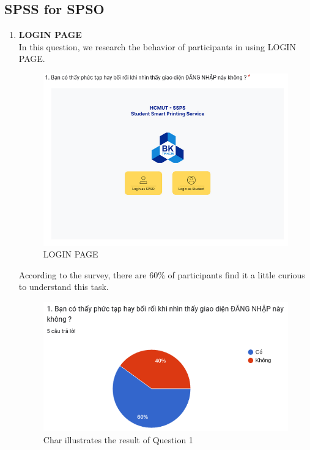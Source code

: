 \documentclass[a4paper]{report}
\begin{document}
\subsection{SPSS for SPSO}
\begin{enumerate}
    \item \textbf{LOGIN PAGE} \\
    In this question, we research the behavior of participants in using LOGIN PAGE.
\begin{figure}[!h]
    \centering
    \includegraphics[width=0.8\linewidth]{images/image_uasbility/Q1_SPSO.png}
    \caption{LOGIN PAGE}
    \label{fig:LOGIN PAGE}
\end{figure}
\newpage
According to the survey, there are 60\% of participants find it a little curious to understand this task.
\begin{figure}[!h]
    \centering
    \includegraphics[width=0.8\linewidth]{images/image_uasbility/A1_SPSO.png}
    \caption{Char illustrates the result of Question 1}
    \label{fig:Chat illustrates the results of Question 1}
\end{figure}



\end{enumerate}
\end{document}
